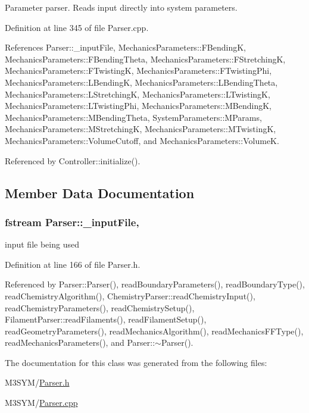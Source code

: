 Parameter parser. Reads input directly into system parameters. 



Definition at line 345 of file Parser.\+cpp.



References Parser\+::\+\_\+input\+File, Mechanics\+Parameters\+::\+F\+Bending\+K, Mechanics\+Parameters\+::\+F\+Bending\+Theta, Mechanics\+Parameters\+::\+F\+Stretching\+K, Mechanics\+Parameters\+::\+F\+Twisting\+K, Mechanics\+Parameters\+::\+F\+Twisting\+Phi, Mechanics\+Parameters\+::\+L\+Bending\+K, Mechanics\+Parameters\+::\+L\+Bending\+Theta, Mechanics\+Parameters\+::\+L\+Stretching\+K, Mechanics\+Parameters\+::\+L\+Twisting\+K, Mechanics\+Parameters\+::\+L\+Twisting\+Phi, Mechanics\+Parameters\+::\+M\+Bending\+K, Mechanics\+Parameters\+::\+M\+Bending\+Theta, System\+Parameters\+::\+M\+Params, Mechanics\+Parameters\+::\+M\+Stretching\+K, Mechanics\+Parameters\+::\+M\+Twisting\+K, Mechanics\+Parameters\+::\+Volume\+Cutoff, and Mechanics\+Parameters\+::\+Volume\+K.



Referenced by Controller\+::initialize().



\subsection{Member Data Documentation}
\hypertarget{classParser_adc64c51d84a8fe723f7b4f13ca4d37cd}{
\subsubsection[{\+\_\+input\+File}]{\setlength{\rightskip}{0pt plus 5cm}fstream Parser\+::\+\_\+input\+File\hspace{0.3cm}{\ttfamily [protected]}, {\ttfamily [inherited]}}}\label{classParser_adc64c51d84a8fe723f7b4f13ca4d37cd}


input file being used 



Definition at line 166 of file Parser.\+h.



Referenced by Parser\+::\+Parser(), read\+Boundary\+Parameters(), read\+Boundary\+Type(), read\+Chemistry\+Algorithm(), Chemistry\+Parser\+::read\+Chemistry\+Input(), read\+Chemistry\+Parameters(), read\+Chemistry\+Setup(), Filament\+Parser\+::read\+Filaments(), read\+Filament\+Setup(), read\+Geometry\+Parameters(), read\+Mechanics\+Algorithm(), read\+Mechanics\+F\+F\+Type(), read\+Mechanics\+Parameters(), and Parser\+::$\sim$\+Parser().



The documentation for this class was generated from the following files\+:\begin{DoxyCompactItemize}
\item 
M3\+S\+Y\+M/\hyperlink{Parser_8h}{Parser.\+h}\item 
M3\+S\+Y\+M/\hyperlink{Parser_8cpp}{Parser.\+cpp}\end{DoxyCompactItemize}
